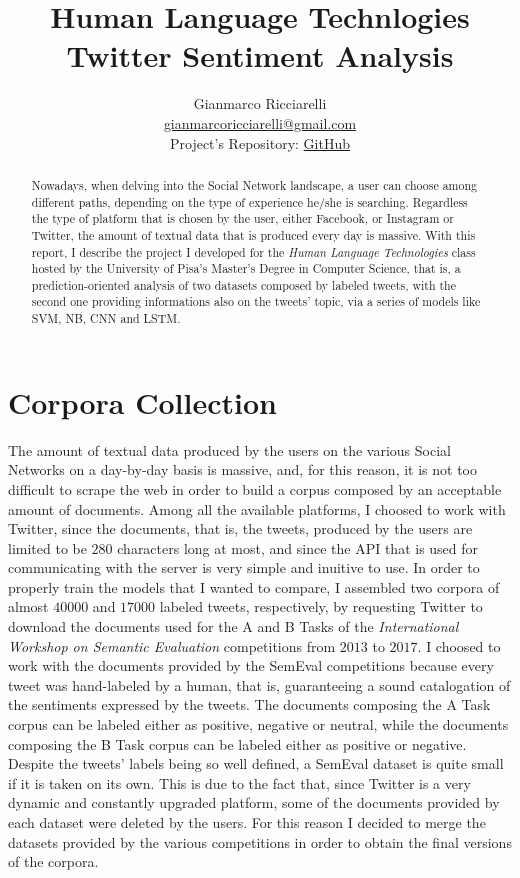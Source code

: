 \documentclass[11pt,twocolumn]{article}
\title{\textbf{Human Language Technlogies \\ Twitter Sentiment Analysis}}
\author{Gianmarco Ricciarelli \\ \href{mailto:gianmarcoricciarelli@gmail.com}{gianmarcoricciarelli@gmail.com}\\
Project's Repository: \href{https://github.com/germz01/twitter_sentiment_analysis}{GitHub}}
\date{}
\begin{document}
    \maketitle

    \begin{abstract}
        \noindent
        Nowadays, when delving into the Social Network landscape, a user can choose among different
        paths, depending on the type of experience he/she is searching. Regardless the type of platform that
        is chosen by the user, either Facebook, or Instagram or Twitter, the amount of textual data that is
        produced every day is massive. With this report, I describe the project I developed for the
        \textit{Human Language Technologies} class hosted by the University of Pisa's Master's Degree in
        Computer Science, that is, a prediction-oriented analysis of two datasets composed by labeled tweets,
        with the second one providing informations also on the tweets' topic, via a series of models like SVM,
        NB, CNN and LSTM.
    \end{abstract}

    \section{Corpora Collection} %
    \label{sec:corpus_collection}
        The amount of textual data produced by the users on the various Social Networks on a day-by-day
        basis is massive, and, for this reason, it is not too difficult to scrape the web in order to
        build a corpus composed by an acceptable amount of documents. Among all the available platforms, I
        choosed to work with Twitter, since the documents, that is, the tweets, produced by the users are
        limited to be $280$ characters long at most, and since the API that is used for communicating with
        the server is very simple and inuitive to use. In order to properly train the models that I
        wanted to compare, I assembled two corpora of almost $40000$ and $17000$ labeled tweets, respectively, by
        requesting Twitter to download the documents used for the A and B Tasks of the
        \textit{International Workshop on Semantic Evaluation} competitions from $2013$ to $2017$.
        I choosed to work with the documents provided by the SemEval
        competitions because every tweet was hand-labeled by a human, that is, guaranteeing a sound
        catalogation of the sentiments expressed by the tweets. The documents composing the A Task corpus can be
        labeled either as positive, negative or neutral, while the documents composing the B Task corpus can be
        labeled either as positive or negative. Despite the tweets' labels being so well defined, a SemEval
        dataset is quite small if it is taken on its own. This is due to the fact that, since Twitter is a
        very dynamic and constantly upgraded platform, some of the documents provided by each dataset
        were deleted by the users. For this reason I decided to merge the datasets provided by the various
        competitions in order to obtain the final versions of the corpora.
\end{document}
